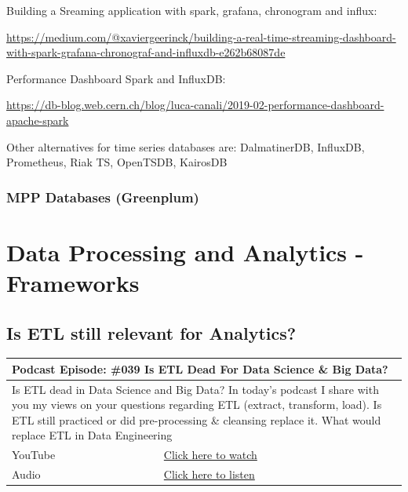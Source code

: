 \documentclass[12pt, numbers=noenddot]{scrreprt} %
\begin{document}
Building a Sreaming application with spark, grafana, chronogram and influx:

\url{https://medium.com/@xaviergeerinck/building-a-real-time-streaming-dashboard-with-spark-grafana-chronograf-and-influxdb-e262b68087de}

Performance Dashboard Spark and InfluxDB:

\url{https://db-blog.web.cern.ch/blog/luca-canali/2019-02-performance-dashboard-apache-spark}

Other alternatives for time series databases are: DalmatinerDB, InfluxDB, Prometheus, Riak TS, OpenTSDB, KairosDB


\subsection{MPP Databases (Greenplum)}


\chapter{Data Processing and Analytics - Frameworks}

\section{Is ETL still relevant for Analytics?}

\begin{table}[h]
\begin{tabular}{ll}
\hline
\multicolumn{2}{l}{\textbf{Podcast Episode:} \#039 Is ETL Dead For Data Science \& Big Data?} \\ \hline
\multicolumn{2}{p{15cm}}{Is ETL dead in Data Science and Big Data? In today's podcast I share with you my views on your questions regarding ETL (extract, transform, load). Is ETL still practiced or did pre-processing \& cleansing replace it. What would replace ETL in Data Engineering}         \\ \hline
\multicolumn{1}{l|}{YouTube}   & \href{https://youtu.be/leSOWPaNkl4}{Click here to watch}   \\
\multicolumn{1}{l|}{Audio}     & \href{https://anchor.fm/andreaskayy/episodes/Is-ETL-Dead-For-Data-Science--Big-Data---PoDS-039-e2b604}{Click here to listen}   \\ \hline
\end{tabular}
\end{table}
\end{document}
